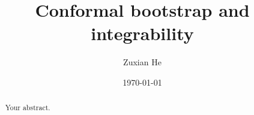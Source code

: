\documentclass{article}
\title{Conformal bootstrap and integrability}
\author{Zuxian He}
\date{\today}
\begin{document}
\maketitle
\begin{abstract}
Your abstract.
\end{abstract}





%
%
\end{document}
